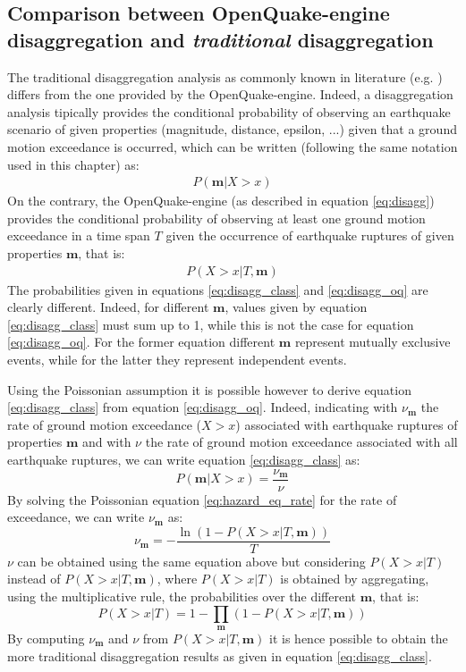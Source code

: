 \subsection{Comparison between OpenQuake-engine disaggregation and \textit{traditional} disaggregation}
The traditional disaggregation analysis as commonly known in literature (e.g. \cite{bazzurro1999}) differs from the one
provided by the OpenQuake-engine. Indeed, a disaggregation analysis tipically provides the conditional probability of
observing an earthquake scenario of given properties (magnitude, distance, epsilon, ...) given that a ground motion
exceedance is occurred, which can be written (following the same notation used in this chapter) as:
\begin{align}
\label{eq:disagg_class}
P(\bm{m} | X > x)
\end{align}
On the contrary, the OpenQuake-engine (as described in equation \ref{eq:disagg}) provides the conditional probability of observing
at least one ground motion exceedance in a time span $T$ given the occurrence of earthquake ruptures of given properties $\bm{m}$,
that is:
\begin{align}
\label{eq:disagg_oq}
P(X > x | T, \bm{m})
\end{align}
The probabilities given in equations \ref{eq:disagg_class} and \ref{eq:disagg_oq} are clearly different. Indeed, for different $\bm{m}$, values given
by equation \ref{eq:disagg_class}  must sum up to 1, while this is not the case for equation \ref{eq:disagg_oq}. For the former equation different $\bm{m}$ represent mutually exclusive events, while for the latter they represent independent events.

Using the Poissonian assumption it is possible however to derive equation \ref{eq:disagg_class} from equation \ref{eq:disagg_oq}. Indeed,
indicating with $\nu_{\bm{m}}$ the rate of ground motion exceedance ($X>x$) associated with earthquake ruptures of properties $\bm{m}$ and with $\nu$ the rate of ground motion exceedance associated with all earthquake ruptures, we can write equation \ref{eq:disagg_class} as:
\begin{equation}
P(\bm{m} | X > x) = \frac{\nu_{\bm{m}}}{\nu}
\end{equation}
By solving the Poissonian equation \ref{eq:hazard_eq_rate} for the rate of exceedance, we can write $\nu_{\bm{m}}$ as:
\begin{equation}
\nu_{\bm{m}} = - \frac{\ln(1 - P(X > x | T, \bm{m}))}{T}
\end{equation}
$\nu$ can be obtained using the same equation above but considering $P(X > x | T)$ instead of $P(X > x | T, \bm{m})$, where $P(X > x | T)$ is
obtained by aggregating, using the multiplicative rule, the probabilities over the different $\bm{m}$, that is:
\begin{equation}
P(X > x | T) = 1 - \prod_{\bm{m}}(1 - P(X > x | T, \bm{m}))
\end{equation}
By computing $\nu_{\bm{m}}$ and $\nu$ from $P(X > x | T, \bm{m})$ it is hence possible to obtain the more traditional disaggregation results as given in equation \ref{eq:disagg_class}.

